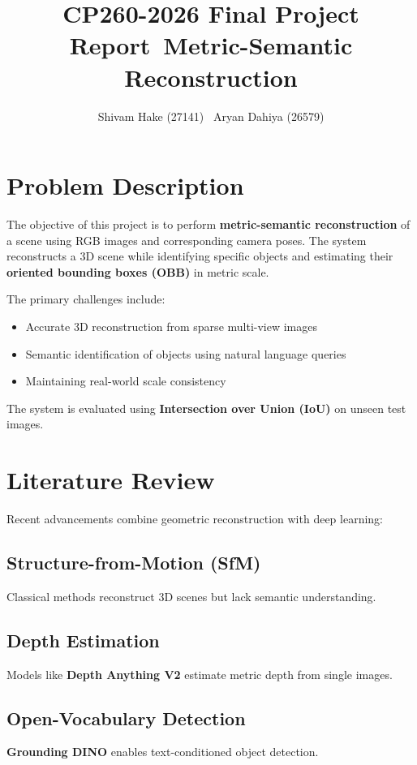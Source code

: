\documentclass[11pt]{article}
\title{\textbf{CP260-2026 Final Project Report}\
\large Metric-Semantic Reconstruction}
\author{
Shivam Hake (27141) \
Aryan Dahiya (26579)
}
\date{}
\begin{document}
\maketitle

\section{Problem Description}

The objective of this project is to perform \textbf{metric-semantic reconstruction} of a scene using RGB images and corresponding camera poses. The system reconstructs a 3D scene while identifying specific objects and estimating their \textbf{oriented bounding boxes (OBB)} in metric scale.

The primary challenges include:
\begin{itemize}
\item Accurate 3D reconstruction from sparse multi-view images
\item Semantic identification of objects using natural language queries
\item Maintaining real-world scale consistency
\end{itemize}

The system is evaluated using \textbf{Intersection over Union (IoU)} on unseen test images.

\section{Literature Review}

Recent advancements combine geometric reconstruction with deep learning:

\subsection{Structure-from-Motion (SfM)}
Classical methods reconstruct 3D scenes but lack semantic understanding.

\subsection{Depth Estimation}
Models like \textbf{Depth Anything V2} estimate metric depth from single images.

\subsection{Open-Vocabulary Detection}
\textbf{Grounding DINO} enables text-conditioned object detection.
\end{document}
